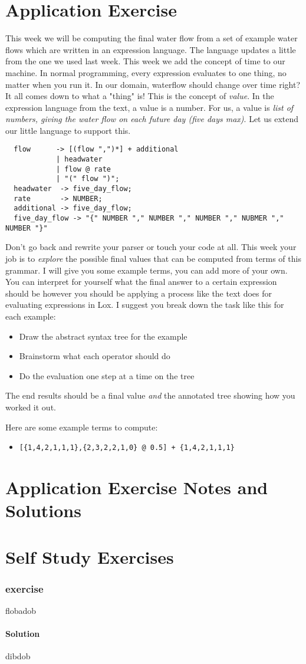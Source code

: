 \documentclass[twoside=false, DIV=14]{scrartcl}
\begin{document}
\newpage
\part*{Application Exercise}
This week we will be computing the final water flow from a set of example water flows which are written in an expression language.  The language updates a little from the one we used last week.  This week we add the concept of time to our machine.  In normal programming, every expression evaluates to one thing, no matter when you run it.  In our domain, waterflow should change over time right?  It all comes down to what a "thing" is!  This is the concept of \emph{value}.  In the expression language from the text, a value is a number.  For us, a value is \emph{list of numbers, giving the water flow on each future day (five days max)}.  Let us extend our little language to support this.

\begin{lstlisting}
  flow      -> [(flow ",")*] + additional  
            | headwater 
            | flow @ rate
            | "(" flow ")";
  headwater  -> five_day_flow;
  rate       -> NUMBER;
  additional -> five_day_flow;
  five_day_flow -> "{" NUMBER "," NUMBER "," NUMBER "," NUBMER "," NUMBER "}"
\end{lstlisting}
Don't go back and rewrite your parser or touch your code at all.  This week your job is to \emph{explore} the possible final values that can be computed from terms of this grammar.  I will give you some example terms, you can add more of your own.  You can interpret for yourself what the final answer to a certain expression should be however you should be applying a process like the text does for evaluating expressions in Lox.  I suggest you break down the task like this for each example:
\begin{itemize}
\item Draw the abstract syntax tree for the example
\item Brainstorm what each operator should do
\item Do the evaluation one step at a time on the tree
\end{itemize}
The end results should be a final value \emph{and} the annotated tree showing how you worked it out.

Here are some example terms to compute:
\begin{itemize}
\item \lstinline|[{1,4,2,1,1,1},{2,3,2,2,1,0} @ 0.5] + {1,4,2,1,1,1}|
\end{itemize}


\newpage
\part*{Application Exercise Notes and Solutions}

\newpage
\part*{Self Study Exercises}
\section*{exercise}
flobadob

\subsection*{Solution}
dibdob
\end{document}
